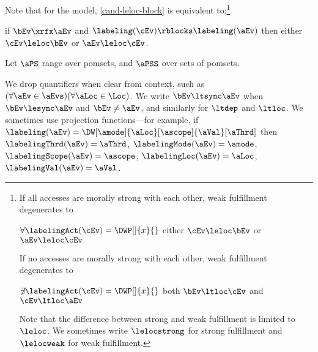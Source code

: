 Note that for the \IMM{} model, \ref{cand-leloc-block} is equivalent to:\footnote{If all accesses are morally strong with each other, weak fulfillment
  degenerates to
  \begin{center}
    $\forall\labelingAct(\cEv)=\DWP[]{x}{}$ either
    $\cEv \leloc \bEv$ or $\aEv \leloc \cEv$
  \end{center}

  If no accesses are morally strong with each other, weak fulfillment
  degenerates to
  \begin{center}
    $\not\mkern-5mu\exists\labelingAct(\cEv)=\DWP[]{x}{}$ 
    both $\bEv \ltloc \cEv$ and $\cEv \ltloc \aEv$
  \end{center}

  Note that the difference between strong and weak fulfillment is limited to $\leloc$.
  We sometimes write $\lelocstrong$ for strong fulfillment and
  $\lelocweak$ for weak fulfillment.}
\begin{center}
  if $\bEv\xrfx\aEv$ and $\labeling(\cEv) \rblocks \labeling(\aEv)$ then
  either $\cEv\leloc\bEv$ or $\aEv\leloc\cEv$.
\end{center}





Let $\aPS$ range over pomsets, and $\aPSS$ over sets of pomsets.

We drop quantifiers
when clear from context, such as
$(\forall\aEv\in\aEvs)(\forall\aLoc\in\Loc)$.
We write $\bEv\ltsync\aEv$ when $\bEv\lesync\aEv$ and $\bEv\neq\aEv$, and similarly
for $\ltdep$ and $\ltloc$.
We sometimes use projection functions---for example, if
$\labeling(\aEv)=\DW[\amode]{\aLoc}[\ascope]{\aVal}[\aThrd]$ then 
$\labelingThrd(\aEv)=\aThrd$,
$\labelingMode(\aEv)=\amode$,
$\labelingScope(\aEv)=\ascope$,
$\labelingLoc(\aEv)=\aLoc$,
$\labelingVal(\aEv)=\aVal$.

